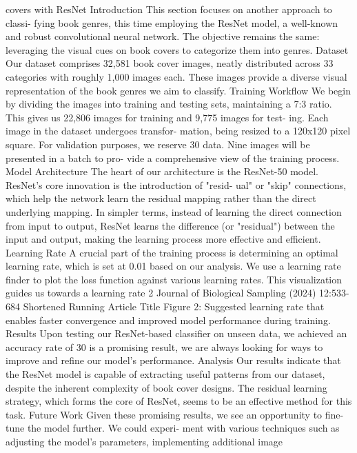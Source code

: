 covers with ResNet
Introduction
This section focuses on another approach to classi-
fying book genres, this time employing the ResNet
model, a well-known and robust convolutional neural
network. The objective remains the same: leveraging
the visual cues on book covers to categorize them
into genres.
Dataset
Our dataset comprises 32,581 book cover images,
neatly distributed across 33 categories with roughly
1,000 images each. These images provide a diverse
visual representation of the book genres we aim to
classify.
Training Workflow
We begin by dividing the images into training and
testing sets, maintaining a 7:3 ratio. This gives us
22,806 images for training and 9,775 images for test-
ing. Each image in the dataset undergoes transfor-
mation, being resized to a 120x120 pixel square. For
validation purposes, we reserve 30%
data. Nine images will be presented in a batch to pro-
vide a comprehensive view of the training process.
Model Architecture
The heart of our architecture is the ResNet-50 model.
ResNet’s core innovation is the introduction of "resid-
ual" or "skip" connections, which help the network
learn the residual mapping rather than the direct
underlying mapping. In simpler terms, instead of
learning the direct connection from input to output,
ResNet learns the difference (or "residual") between
the input and output, making the learning process
more effective and efficient.
Learning Rate
A crucial part of the training process is determining
an optimal learning rate, which is set at 0.01 based
on our analysis. We use a learning rate finder to
plot the loss function against various learning rates.
This visualization guides us towards a learning rate
2 Journal of Biological Sampling (2024) 12:533-684
Shortened Running Article Title
Figure 2: Suggested learning rate
that enables faster convergence and improved model
performance during training.
Results
Upon testing our ResNet-based classifier on unseen
data, we achieved an accuracy rate of 30%
is a promising result, we are always looking for ways
to improve and refine our model’s performance.
Analysis
Our results indicate that the ResNet model is capable
of extracting useful patterns from our dataset, despite
the inherent complexity of book cover designs. The
residual learning strategy, which forms the core of
ResNet, seems to be an effective method for this task.
Future Work
Given these promising results, we see an opportunity
to fine-tune the model further. We could experi-
ment with various techniques such as adjusting the
model’s parameters, implementing additional image

